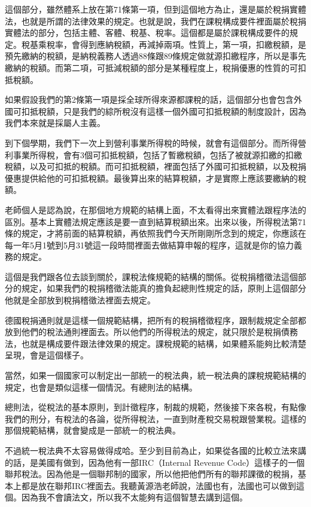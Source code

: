 \documentclass[]{ctexbook}
\begin{document}
這個部分，雖然體系上放在第71條第一項，但到這個地方為止，還是屬於稅捐實體法，也就是所謂的法律效果的規定。也就是說，我們在課稅構成要件裡面屬於稅捐實體法的部分，包括主體、客體、稅基、稅率。這個都是屬於課稅構成要件的規定。稅基乘稅率，會得到應納稅額，再減掉兩項。性質上，第一項，扣繳稅額，是預先繳納的稅額，是納稅義務人透過88條跟89條規定做就源扣繳程序，所以是事先繳納的稅額。而第二項，可抵減稅額的部分是某種程度上，稅捐優惠的性質的可扣抵稅額。

如果假設我們的第2條第一項是採全球所得來源都課稅的話，這個部分也會包含外國可扣抵稅額，只是我們的綜所稅沒有這樣一個外國可扣抵稅額的制度設計，因為我們本來就是採屬人主義。

到下個學期，我們下一次上到營利事業所得稅的時候，就會有這個部分。而所得營利事業所得稅，會有3個可扣抵稅額，包括了暫繳稅額，包括了被就源扣繳的扣繳稅額，以及可扣抵的稅額。而可扣抵稅額，裡面包括了外國可扣抵稅額，以及稅捐優惠提供給他的可扣抵稅額。最後算出來的結算稅額，才是實際上應該要繳納的稅額。

老師個人是認為說，在那個地方規範的結構上面，不太看得出來實體法跟程序法的區別。基本上實體法規定應該是要一直到結算稅額出來。出來以後，所得稅法第71條的規定，才將前面的結算稅額，再依照我們今天所剛剛所念到的規定，你應該在每一年5月1號到5月31號這一段時間裡面去做結算申報的程序，這就是你的協力義務的規定。

這個是我們跟各位去談到關於，課稅法條規範的結構的關係。從稅捐稽徵法這個部分的規定，如果我們的稅捐稽徵法能真的擔負起總則性規定的話，原則上這個部分他就是全部放到稅捐稽徵法裡面去規定。

德國稅捐通則就是這樣一個規範結構，把所有的稅捐稽徵程序，跟制裁規定全部都放到他們的稅法通則裡面去。所以他們的所得稅法的規定，就只限於是稅捐債務法，也就是構成要件跟法律效果的規定。課稅規範的結構，如果體系能夠比較清楚呈現，會是這個樣子。

當然，如果一個國家可以制定出一部統一的稅法典，統一稅法典的課稅規範結構的規定，也會是類似這樣一個情況。有總則法的結構。

總則法，從稅法的基本原則，到計徵程序，制裁的規範，然後接下來各稅，有點像我們的刑分，有稅法的各論，從所得稅法，一直到財產稅交易稅跟營業稅。這樣的那個規範結構，就會變成是一部統一的稅法典。

不過統一稅法典不太容易做得成哈。至少到目前為止，如果從各國的比較立法來講的話，是美國有做到，因為他有一部IRC（Internal Revenue Code）這樣子的一個聯邦稅法。因為他是一個聯邦制的國家，所以他把他們所有的聯邦課徵的稅捐，基本上都是放在聯邦IRC裡面去。我聽黃源浩老師說，法國也有，法國也可以做到這個。因為我不會讀法文，所以我不太能夠有這個智慧去講到這個。
\end{document}

